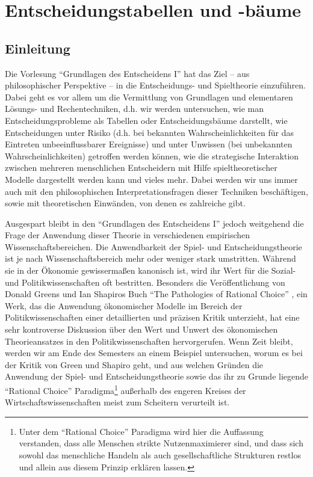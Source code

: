 \section{Entscheidungstabellen und -bäume}

\subsection{Einleitung}

Die Vorlesung "`Grundlagen des Entscheidens I"' hat das Ziel -- aus
philosophischer Perspektive -- in die Entscheidungs- und Spieltheorie
einzuführen. Dabei geht es vor allem um die Vermittlung von Grundlagen
und elementaren Lösungs- und Rechentechniken, d.h. wir werden
untersuchen, wie man Entscheidungsprobleme als Tabellen oder
Entscheidungsbäume darstellt, wie Entscheidungen unter Risiko (d.h.
bei bekannten Wahrscheinlichkeiten für das Eintreten unbeeinflussbarer
Ereignisse) und unter Unwissen (bei unbekannten Wahrscheinlichkeiten)
getroffen werden können, wie die strategische Interaktion zwischen
mehreren menschlichen Entscheidern mit Hilfe spieltheoretischer
Modelle dargestellt werden kann und vieles mehr. Dabei werden wir uns
immer auch mit den philosophischen Interpretationsfragen dieser
Techniken beschäftigen, sowie mit theoretischen Einwänden, von denen
es zahlreiche gibt.

Ausgespart bleibt in den "`Grundlagen des Entscheidens I"' jedoch
weitgehend die Frage der Anwendung dieser Theorie in verschiedenen
empirischen Wissenschaftsbereichen. Die Anwendbarkeit der Spiel- und
Entscheidungstheorie ist je nach Wissenschaftsbereich mehr oder
weniger stark umstritten. Während sie in der Ökonomie gewissermaßen
kanonisch ist, wird ihr Wert für die Sozial- und Politikwissenschaften
oft bestritten. Besonders die Veröffentlichung von Donald Greens und
Ian Shapiros Buch "`The Pathologies of Rational Choice"'
\cite{green-shapiro:1994}, ein Werk, das die Anwendung ökonomischer
Modelle im Bereich der Politikwissenschaften einer detaillierten und
präzisen Kritik unterzieht, hat eine sehr kontroverse Diskussion über
den Wert und Unwert des ökonomischen Theorieansatzes in den
Politikwissenschaften hervorgerufen. Wenn Zeit bleibt, werden wir am
Ende des Semesters an einem Beispiel untersuchen, worum es bei der
Kritik von Green und Shapiro geht, und aus welchen Gründen die
Anwendung der Spiel- und Entscheidungstheorie sowie das ihr zu Grunde
liegende "`Rational Choice"' Paradigma\footnote{Unter dem "`Rational
  Choice"' Paradigma wird hier die Auffassung verstanden, dass alle
  Menschen strikte Nutzenmaximierer sind, und dass sich sowohl das
  menschliche Handeln als auch gesellschaftliche Strukturen restlos
  und allein aus diesem Prinzip erklären lassen.} außerhalb des
engeren Kreises der Wirtschaftswissenschaften meist zum Scheitern
verurteilt ist.


